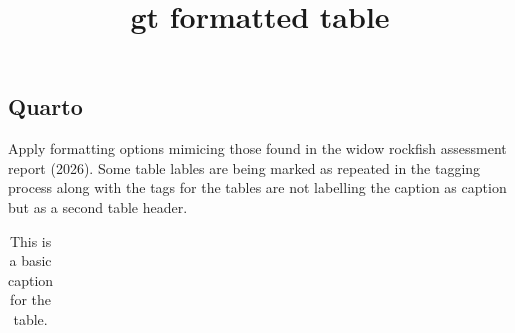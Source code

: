 \documentclass[
  letterpaper,
  DIV=11,
  numbers=noendperiod]{scrartcl}
\title{gt formatted table}
\author{}
\date{}
\begin{document}
\maketitle


\subsection{Quarto}\label{quarto}

Apply formatting options mimicing those found in the widow rockfish
assessment report (2026). Some table lables are being marked as repeated
in the tagging process along with the tags for the tables are not
labelling the caption as caption but as a second table header.

\begingroup

\begin{longtable}{rr}

\caption{\label{tbl-format-gt}This is a basic caption for the table.}

\tabularnewline


\end{longtable}
\end{document}
